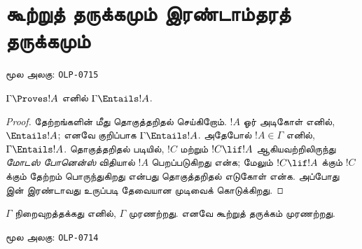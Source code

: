 \documentclass[11pt,a4paper,openany]{memoir}
\begin{document}

\clearpage
\endgroup

\chapter{கூற்றுத் தருக்கமும் இரண்டாம்தரத் தருக்கமும்}
\clearpage
\noindent மூல அலகு: \texttt{OLP-0715}\par





\begin{thm}[சரித்தன்மை]
$\Gamma\Proves!A$ எனில் $\Gamma \Entails !A$.
\end{thm}

\begin{proof}
தேற்றங்களின் மீது தொகுத்தறிதல் செய்கிறோம். $!A$ ஓர் அடிகோள் எனில்,
$\Entails !A$; எனவே குறிப்பாக $\Gamma \Entails!A$.
அதேபோல் $!A \in \Gamma$ எனில், $\Gamma \Entails!A$.
தொகுத்தறிதல் படியில், $!C$ மற்றும் $!C\lif!A$ ஆகியவற்றிலிருந்து
\emph{மோடஸ் போனென்ஸ்} விதியால் $!A$ பெறப்படுகிறது என்க;
மேலும் $!C\lif !A$ க்கும் $!C$ க்கும் தேற்றம் பொருந்துகிறது என்பது
தொகுத்தறிதல் எடுகோள் என்க. அப்போது
 இன் இரண்டாவது உருப்படி
தேவையான முடிவைக் கொடுக்கிறது.
\end{proof}

\begin{cor}
$\Gamma$ நிறைவுறத்தக்கது எனில், $\Gamma$ முரணற்றது.
எனவே கூற்றுத் தருக்கம் முரணற்றது.
\end{cor}



\clearpage
\noindent மூல அலகு: \texttt{OLP-0714}\par




\end{document}
